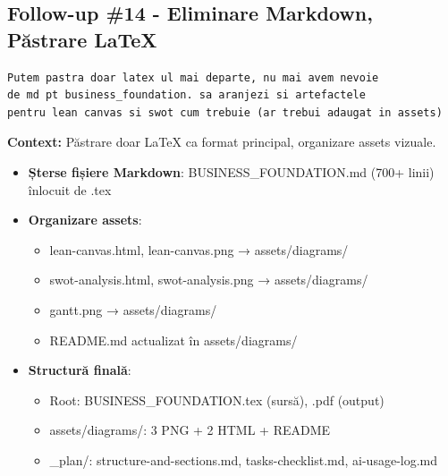 \documentclass[11pt,a4paper]{article}
\begin{document}
\newpage
\subsection{Follow-up \#14 - Eliminare Markdown, Păstrare LaTeX}

\begin{tcolorbox}[colback=promptbackground,colframe=blue!75!black,title=Prompt Input]
\begin{verbatim}
Putem pastra doar latex ul mai departe, nu mai avem nevoie
de md pt business_foundation. sa aranjezi si artefactele
pentru lean canvas si swot cum trebuie (ar trebui adaugat in assets)
\end{verbatim}
\end{tcolorbox}

\textbf{Context:} Păstrare doar LaTeX ca format principal, organizare assets vizuale.

\begin{tcolorbox}[colback=outputbackground,colframe=green!75!black,title=Output Generat]
\begin{itemize}[leftmargin=*]
    \item \textbf{Șterse fișiere Markdown}: BUSINESS\_FOUNDATION.md (700+ linii) înlocuit de .tex
    \item \textbf{Organizare assets}:
    \begin{itemize}
        \item lean-canvas.html, lean-canvas.png → assets/diagrams/
        \item swot-analysis.html, swot-analysis.png → assets/diagrams/
        \item gantt.png → assets/diagrams/
        \item README.md actualizat în assets/diagrams/
    \end{itemize}
    \item \textbf{Structură finală}:
    \begin{itemize}
        \item Root: BUSINESS\_FOUNDATION.tex (sursă), .pdf (output)
        \item assets/diagrams/: 3 PNG + 2 HTML + README
        \item \_plan/: structure-and-sections.md, tasks-checklist.md, ai-usage-log.md
    \end{itemize}
\end{itemize}
\end{tcolorbox}
\end{document}
